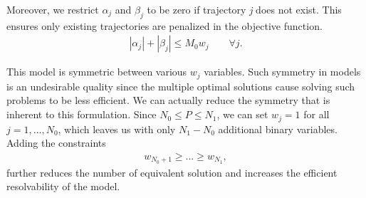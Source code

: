 Moreover, we restrict $\alpha_{j}$ and $\beta_{j}$ to be zero if trajectory \textit{j} does not exist. This ensures only existing trajectories are penalized in the objective function. 
\begin{align*}
|\alpha_{j}|+|\beta_{j}| \leq M_{0}w_{j}\qquad \forall j.
\end{align*}

This model is symmetric between various $w_j$ variables. Such symmetry in models is an undesirable quality since the multiple optimal solutions cause solving such problems to be less efficient. We can actually reduce the symmetry that is inherent to this formulation. Since $N_{0} \leq P \leq N_{1}$, we can set $w_j=1$ for all $j=1,\ldots,N_0$, which leaves us with only $N_1-N_0$ additional binary variables. Adding the constraints
\begin{align*}
w_{N_0+1}\geq ...\geq w_{N_1},
\end{align*}
further reduces the number of equivalent solution and increases the efficient resolvability of the model. 

